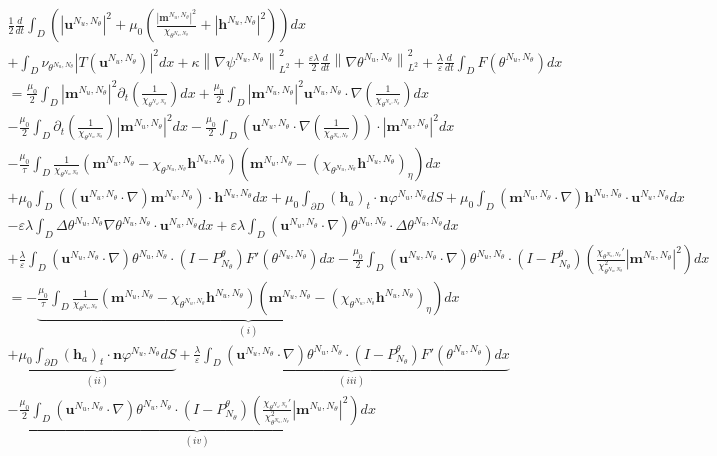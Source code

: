 \documentclass[10pt,letterpaper,twoside]{amsart}
\theoremstyle{definition}{\newtheorem{definition}[lemma]{Definition}}
\theoremstyle{note}{\newtheorem{claim}{Claim}[section]
\newtheorem*{claim*}{Claim}}
\numberwithin{equation}{section}
\newcommand{\dom}{D}
\newcommand{\norm}[1]{\left\| #1 \right\|}
\newcommand{\Grad}{\nabla}
\newcommand{\bmb}{\mathbf{m}^{N_u,N_\theta}}
\newcommand{\bhb}{\mathbf{h}^{N_u,N_\theta}}
\newcommand{\bub}{\mathbf{u}^{N_u,N_\theta}}
\newcommand{\thb}{\theta^{N_u,N_\theta}}
\newcommand{\phb}{\varphi^{N_u,N_\theta}}
\newcommand{\psib}{\psi^{N_u,N_\theta}}
\newcommand{\bh}{\mathbf{h}}
\begin{document}
 \begin{multline}\label{eq:energyuthetadisc}
 	\frac{1}{2}\frac{d}{dt}\int_{\dom} \left(|\bub|^2 + \mu_0\left(\frac{|\bmb|^2}{\chi_{\thb}}+|\bhb|^2\right) \right)dx\\
 	+ \int_{\dom}\nu_{\thb} |T(\bub)|^2 dx  +\kappa\norm{\Grad\psib}_{L^2}^2+\frac{\varepsilon\lambda}{2}\frac{d}{dt}\norm{\Grad\thb}_{L^2}^2 +\frac{\lambda}{\varepsilon}\frac{d}{dt}\int_{\dom} F(\thb) dx\\
 	 = \frac{\mu_0}{2}\int_{\dom} |\bmb|^2 \partial_t\left(\frac{1}{\chi_{\thb}}\right) dx   	+\frac{\mu_0}{2}\int_{\dom} |\bmb|^2 \bub\cdot\Grad\left(\frac{1}{\chi_{\thb}}\right) dx\\
 -\frac{\mu_0}{2}\int_{\dom} \partial_t\left(\frac{1}{\chi_{\thb}}\right) |\bmb|^2 dx	- \frac{\mu_0}{2}\int_{\dom} \left(\bub\cdot\Grad\left(\frac{1}{\chi_{\thb}}\right) \right)\cdot|\bmb|^2 dx \\
  - \frac{\mu_0}{\tau}\int_{\dom}\frac{1}{\chi_{\thb}}\left(\bmb-\chi_{\thb}\bhb\right)\left(\bmb-(\chi_{\thb}\bhb)_{\eta}\right) dx \\
 		+ \mu_0\int_{\dom} ((\bub\cdot\Grad)\bmb )\cdot\bhb dx +\mu_0\int_{\partial\dom}(\bh_a)_t\cdot\mathbf{n}\phb dS
 	+ \mu_0 \int_{\dom} (\bmb\cdot\Grad)\bhb \cdot \bub dx\\
 	 -\varepsilon\lambda\int_{\dom} \Delta\thb \Grad\thb\cdot\bub dx
 	+	\varepsilon\lambda \int_{\dom} (\bub\cdot\Grad)\thb \cdot\Delta \thb dx \\
 	 +\frac{\lambda}{\varepsilon}\int_{\dom} (\bub\cdot\Grad)\thb\cdot (I-P_{N_\theta}^\theta) F'(\thb) dx-\frac{\mu_0}{2}\int_{\dom} (\bub\cdot\Grad)\thb \cdot (I-P_{N_\theta}^\theta) \left(\frac{\chi_{\thb}'}{\chi_{\thb}^2}|\bmb|^2 \right)dx \\ 
 	 = -\underbrace{\frac{\mu_0}{\tau}\int_{\dom}\frac{1}{\chi_{\thb}}\left(\bmb-\chi_{\thb}\bhb\right)\left(\bmb-(\chi_{\thb}\bhb)_{\eta}\right) dx}_{(i)} \\
 	 +\underbrace{\mu_0\int_{\partial\dom}(\bh_a)_t\cdot\mathbf{n}\phb dS}_{(ii)} 
 	 +\underbrace{\frac{\lambda}{\varepsilon}\int_{\dom} (\bub\cdot\Grad)\thb\cdot (I-P_{N_\theta}^\theta) F'(\thb) dx}_{(iii)}\\
 	  -\underbrace{\frac{\mu_0}{2}\int_{\dom} (\bub\cdot\Grad)\thb\cdot (I-P_{N_\theta}^\theta) \left(\frac{\chi_{\thb}'}{\chi_{\thb}^2}|\bmb|^2 \right)dx }_{(iv)}
 \end{multline}
\end{document}
